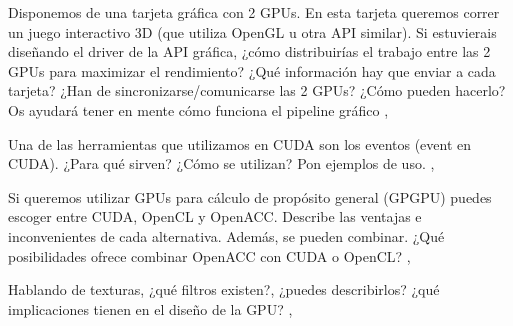 \begin{pregunta}{Disponemos de una tarjeta gráfica con 2 GPUs. En esta tarjeta queremos
    correr un juego interactivo 3D (que utiliza OpenGL u otra API similar). Si
    estuvierais diseñando el driver de la API gráfica, ¿cómo distribuirías el
    trabajo entre las 2 GPUs para maximizar el rendimiento?  ¿Qué información
    hay que enviar a cada tarjeta? ¿Han de sincronizarse/comunicarse las 2 GPUs?
    ¿Cómo pueden hacerlo? Os ayudará tener en mente cómo funciona el pipeline
gráfico} \sep{}

\end{pregunta}
\begin{pregunta}{Una de las herramientas que utilizamos en CUDA son los eventos (event en
CUDA). ¿Para qué sirven? ¿Cómo se utilizan? Pon ejemplos de uso.} \sep{}

\end{pregunta}
\begin{pregunta}{Si queremos utilizar GPUs para cálculo de propósito general (GPGPU)
    puedes escoger entre CUDA, OpenCL y OpenACC. Describe las ventajas e
    inconvenientes de cada alternativa.  Además, se pueden combinar. ¿Qué
posibilidades ofrece combinar OpenACC con CUDA o OpenCL?} \sep{}

\end{pregunta}
\begin{pregunta}{Hablando de texturas, ¿qué filtros existen?, ¿puedes describirlos? ¿qué
implicaciones tienen en el diseño de la GPU?} \sep{}
\end{pregunta}
